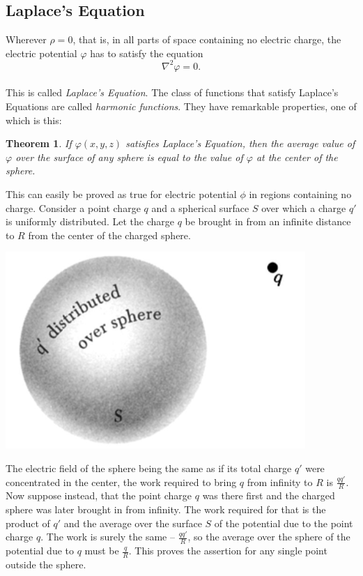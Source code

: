 \documentclass[svgnames]{article}
\newtheorem{theorem}{Theorem}		%
\begin{document}
\subsection{Laplace's Equation}

Wherever $\rho = 0 $, that is, in all parts of space containing no electric
charge, the electric potential  $\varphi$ has to satisfy the equation \[
\nabla^2 \varphi = 0
.\] \\

This is called \textit{Laplace's Equation}. The class of functions that satisfy
Laplace's Equations are called \textit{harmonic functions}. They have
remarkable properties, one of which is this: 

\begin{theorem}
  If $\varphi(x,y,z)$ satisfies Laplace's Equation, then the average value of
  $\varphi$ over the surface of any sphere is equal to the value of $\varphi$
  at the center of the sphere.
\end{theorem}

This can easily be proved as true for electric potential $\phi$ in regions
containing no charge. Consider a point charge $q$ and a spherical surface $S$
over which a charge $q'$ is uniformly distributed. Let the charge $q$ be
brought in from an infinite distance to  $R$ from the center of the charged
sphere. 

\begin{center}
\includegraphics{screenshot 3.png}
\end{center}

The electric field of the sphere being the same as if its total charge $q'$
were concentrated in the center, the work required to bring $q$ from infinity
to $R$ is $\frac{qq'}{R}$. Now suppose instead, that the point charge $q$ was
there first and the charged sphere was later brought in from infinity. The work
required for that is the product of $q'$ and the average over the surface $S$
of the potential due to the point charge $q$. The work is surely the same --
$\frac{qq'}{R}$, so the average over the sphere of the potential due to $q$
must be $\frac{q}{R}$. This proves the assertion for any single point outside
the sphere. 
\end{document}
